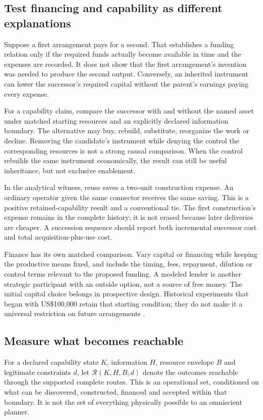 \subsection{Test financing and capability as different explanations}
Suppose a first arrangement pays for a second. That establishes a funding relation only if the required funds actually become available in time and the expenses are recorded. It does not show that the first arrangement's invention was needed to produce the second output. Conversely, an inherited instrument can lower the successor's required capital without the parent's earnings paying every expense.

For a capability claim, compare the successor with and without the named asset under matched starting resources and an explicitly declared information boundary. The alternative may buy, rebuild, substitute, reorganize the work or decline. Removing the candidate's instrument while denying the control the corresponding resources is not a strong causal comparison. When the control rebuilds the same instrument economically, the result can still be useful inheritance, but not exclusive enablement.

In the analytical witness, reuse saves a two-unit construction expense. An ordinary operator given the same connector receives the same saving. This is a positive retained-capability result and a conventional tie. The first construction's expense remains in the complete history; it is not erased because later deliveries are cheaper. A succession sequence should report both incremental successor cost and total acquisition-plus-use cost.

Finance has its own matched comparison. Vary capital or financing while keeping the productive means fixed, and include the timing, fees, repayment, dilution or control terms relevant to the proposed funding. A modeled lender is another strategic participant with an outside option, not a source of free money. The initial capital choice belongs in prospective design. Historical experiments that began with US\$100,000 retain that starting condition; they do not make it a universal restriction on future arrangements \cite{superalpha}.

\subsection{Measure what becomes reachable}
For a declared capability state $K$, information $H$, resource envelope $B$ and legitimate constraints $d$, let $\mathcal R(K,H,B;d)$ denote the outcomes reachable through the supported complete routes. This is an operational set, conditioned on what can be discovered, constructed, financed and accepted within that boundary. It is not the set of everything physically possible to an omniscient planner.


